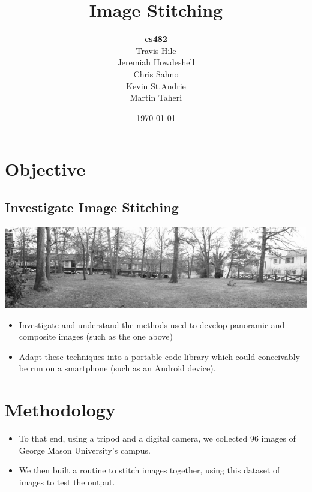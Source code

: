 \documentclass{beamer}
\title{Image Stitching}
\author[\textbf{HHSST}]{\textbf{cs482}\\
Travis Hile\\
Jeremiah Howdeshell\\
Chris Sahno\\
Kevin St.Andrie\\
Martin Taheri
}
\date{\today}
\begin{document}
\frame{\titlepage}

\section[Outline]{}
\frame{\tableofcontents}

\section{Objective}
\subsection{Investigate Image Stitching}
\frame
{
\includegraphics[scale=.5]{rptImages/panoramic_shot.jpg}
\begin{itemize}
\item Investigate and understand the methods used to develop panoramic and composite images (such as the one above)
\item Adapt these techniques into a portable code library which could conceivably be run on a smartphone (such as an Android device).
\end{itemize}
}
\section{Methodology}
\frame
{
\begin{itemize}
	\item To that end, using a tripod and a digital camera, we collected 96 images of George Mason University's campus.
	\item We then built a routine to stitch images together, using this dataset of images to test the output.
\end{itemize}
}
\end{document}
